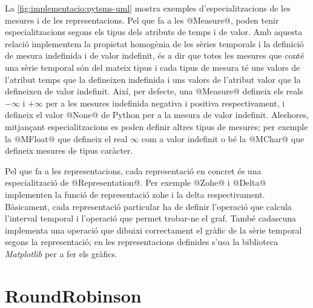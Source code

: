 La \autoref{fig:implementacio:pytsms-uml} mostra exemples
d'especialitzacions de les mesures i de les representacions.
%
Pel que fa a les @Measure@, poden tenir especialitzacions segons
els tipus dels atributs de temps i de valor. Amb aquesta relació
implementem la propietat homogènia de les sèries temporals i la
definició de mesura indefinida i de valor indefinit, és a dir que
totes les mesures que conté una sèrie temporal són del mateix tipus i
cada tipus de mesura té uns valors de l'atribut temps que la
defineixen indefinida i uns valors de l'atribut valor que la
defineixen de valor indefinit.  Així, per defecte, una @Measure@
defineix els reals $-\infty$ i $+\infty$ per a les mesures indefinida
negativa i positiva respectivament, i defineix el valor @None@ de
Python per a la mesura de valor indefinit. Aleshores, mitjançant
especialitzacions es poden definir altres tipus de mesures; per
exemple la @MFloat@ que defineix el real $\infty$ com a valor
indefinit o bé la @MChar@ que defineix mesures de tipus caràcter.




Pel que fa a les representacions, cada representació en concret és una
especialització de @Representation@. Per exemple @Zohe@ i
@Delta@ implementen la funció de representació \gls{zohe} i la delta
respectivament.
Bàsicament, cada representació particular ha de definir l'operació que
calcula l'interval temporal i l'operació que permet trobar-ne el graf.
També cadascuna implementa una operació que dibuixi correctament el
gràfic de la sèrie temporal segons la representació; en les
representacions definides s'usa la biblioteca
\emph{Matplotlib} \parencite{python:matplotlib}  per a fer els gràfics.















\section{RoundRobinson}

